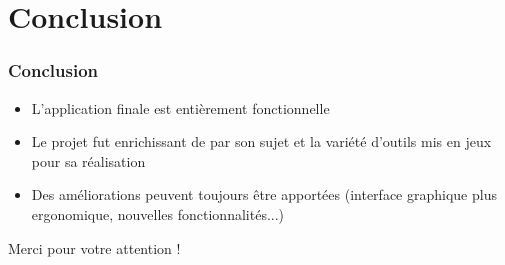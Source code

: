 \documentclass{beamer}
\begin{document}
\section{Conclusion}
\begin{frame}
\frametitle{Conclusion}
\begin{itemize}
\setlength\itemsep{0.5cm}
\item L'application finale est entièrement fonctionnelle
\item Le projet fut enrichissant de par son sujet et la variété d'outils mis en jeux pour sa réalisation
\item Des améliorations peuvent toujours être apportées (interface graphique plus ergonomique, nouvelles fonctionnalités...)
\end{itemize}
\begin{center}
Merci pour votre attention !
\end{center}
\end{frame}
	
\end{document}
